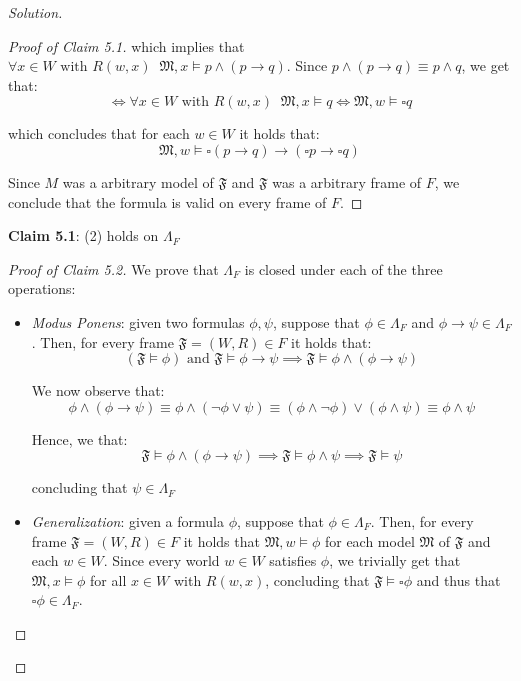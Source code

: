 \documentclass[12pt,a4paper]{report}
\theoremstyle{definition}
\newcommand{\model}[1]{\mathfrak{#1}}           %
\begin{document}
\begin{proof}[Solution]
\begin{proof}[Proof of Claim 5.1]
            which implies that $\forall x \in W \text{ with } R(w,x) \;\; \model{M}, x \models p \land (p \to q)$. Since $p \land (p \to q) \equiv p \land q$, we get that:
            \[\iff \forall x \in W \text{ with } R(w,x) \;\; \model{M}, x \models q \iff \model{M}, w \models \square q\]
            
            which concludes that for each $w \in W$ it holds that:
            \[\model{M}, w \models \square(p \to q) \to (\square p \to \square q)\]

            Since $M$ was a arbitrary model of $\model{F}$ and $\model{F}$ was a arbitrary frame of $F$, we conclude that the formula is valid on every frame of $F$.
        \end{proof}

        \textbf{Claim 5.1}: (2) holds on $\Lambda_{F}$
        
        \begin{proof}[Proof of Claim 5.2]
            We prove that $\Lambda_{F}$ is closed under each of the three operations:
            \begin{itemize}
                \item \textit{Modus Ponens}: given two formulas $\phi, \psi$, suppose that $\phi \in \Lambda_{F}$ and $\phi \to \psi \in \Lambda_F$. Then, for every frame $\model{F} = (W,R) \in F$ it holds that:
                \[(\model{F} \models \phi) \text{ and } \model{F} \models \phi \to \psi \implies \model{F} \models \phi \land (\phi \to \psi)\]
    
                We now observe that:
                \[\phi \land (\phi \to \psi) \equiv \phi \land (\lnot \phi \lor \psi) \equiv (\phi \land \lnot \phi) \lor (\phi \land \psi) \equiv \phi \land \psi\]
    
                Hence, we that:
                \[\model{F} \models \phi \land (\phi \to \psi) \implies \model{F} \models \phi \land \psi \implies \model{F} \models \psi\]
    
                concluding that $\psi \in \Lambda_F$

                \item \textit{Generalization}: given a formula $\phi$, suppose that $\phi \in \Lambda_{F}$. Then, for every frame $\model{F} = (W,R) \in F$ it holds that $\model{M}, w \models \phi$ for each model $\model{M}$ of $\model{F}$ and each $w \in W$. Since every world $w \in W$ satisfies $\phi$, we trivially get that $\model{M}, x \models \phi$ for all $x \in W$ with $R(w,x)$, concluding that $\model{F} \models \square \phi$ and thus that $\square \phi \in \Lambda_{F}$.
                

\end{itemize}
\end{proof}
\end{proof}
\end{document}
